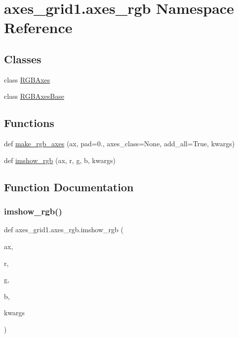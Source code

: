 \hypertarget{namespaceaxes__grid1_1_1axes__rgb}{}\section{axes\+\_\+grid1.\+axes\+\_\+rgb Namespace Reference}
\label{namespaceaxes__grid1_1_1axes__rgb}
\subsection*{Classes}
\begin{DoxyCompactItemize}
\item 
class \hyperlink{classaxes__grid1_1_1axes__rgb_1_1RGBAxes}{R\+G\+B\+Axes}
\item 
class \hyperlink{classaxes__grid1_1_1axes__rgb_1_1RGBAxesBase}{R\+G\+B\+Axes\+Base}
\end{DoxyCompactItemize}
\subsection*{Functions}
\begin{DoxyCompactItemize}
\item 
def \hyperlink{namespaceaxes__grid1_1_1axes__rgb_a862f0b18b511da8369de41b9dbcb9afc}{make\+\_\+rgb\+\_\+axes} (ax, pad=0., axes\+\_\+class=None, add\+\_\+all=True, kwargs)
\item 
def \hyperlink{namespaceaxes__grid1_1_1axes__rgb_a6f5da0222fcb26be812f7b2e79e90723}{imshow\+\_\+rgb} (ax, r, g, b, kwargs)
\end{DoxyCompactItemize}


\subsection{Function Documentation}
\mbox{\label{namespaceaxes__grid1_1_1axes__rgb_a6f5da0222fcb26be812f7b2e79e90723}} 
\subsubsection{\texorpdfstring{imshow\+\_\+rgb()}{imshow\_rgb()}}
{\footnotesize\ttfamily def axes\+\_\+grid1.\+axes\+\_\+rgb.\+imshow\+\_\+rgb (\begin{DoxyParamCaption}\item[{}]{ax,  }\item[{}]{r,  }\item[{}]{g,  }\item[{}]{b,  }\item[{}]{kwargs }\end{DoxyParamCaption})}

